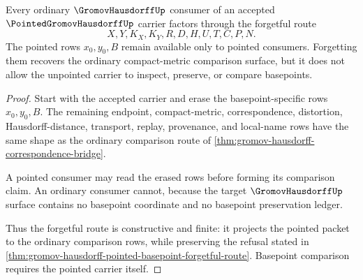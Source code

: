 \begin{theorem}
\label{thm:pointed-gromov-hausdorff-basepoint-forgetful-route}
Every ordinary $\GromovHausdorffUp$ consumer of an accepted $\PointedGromovHausdorffUp$ carrier factors through the forgetful route
$$
X,Y,K_X,K_Y,R,D,H,U,T,C,P,N .
$$
The pointed rows $x_0,y_0,B$ remain available only to pointed consumers. Forgetting them recovers the ordinary compact-metric comparison surface, but it does not allow the unpointed carrier to inspect, preserve, or compare basepoints.
\end{theorem}
\begin{proof}
Start with the accepted carrier and erase the basepoint-specific rows $x_0,y_0,B$. The remaining endpoint, compact-metric, correspondence, distortion, Hausdorff-distance, transport, replay, provenance, and local-name rows have the same shape as the ordinary comparison route of \autoref{thm:gromov-hausdorff-correspondence-bridge}.

A pointed consumer may read the erased rows before forming its comparison claim. An ordinary consumer cannot, because the target $\GromovHausdorffUp$ surface contains no basepoint coordinate and no basepoint preservation ledger.

Thus the forgetful route is constructive and finite: it projects the pointed packet to the ordinary comparison rows, while preserving the refusal stated in \autoref{thm:gromov-hausdorff-pointed-basepoint-forgetful-route}. Basepoint comparison requires the pointed carrier itself.
\end{proof}



